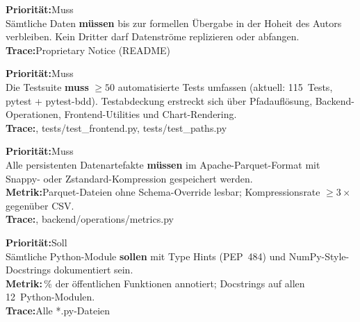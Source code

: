 \documentclass[11pt, a4paper, oneside, openany]{report}
\newcommand{\code}[1]{{\codefont\small\textcolor{DeepNavy}{#1}}}
\begin{document}
\vspace{6pt}

\begin{reqbox}
\textbf{Priorität:}\;Muss \\[4pt]
Sämtliche Daten \textbf{müssen} bis zur formellen Übergabe in der Hoheit des Autors verbleiben. Kein Dritter darf Datenströme replizieren oder abfangen. \\[4pt]
\textbf{Trace:}\;Proprietary Notice (README)
\end{reqbox}

\vspace{6pt}

\begin{reqbox}
\textbf{Priorität:}\;Muss \\[4pt]
Die Testsuite \textbf{muss} $\geq 50$ automatisierte Tests umfassen (aktuell: 115~Tests, pytest + pytest-bdd). Testabdeckung erstreckt sich über Pfadauflösung, Backend-Operationen, Frontend-Utilities und Chart-Rendering. \\[4pt]
\textbf{Trace:}\;\code{tests/test\_backend.py}, \code{tests/test\_frontend.py}, \code{tests/test\_paths.py}
\end{reqbox}

\vspace{6pt}

\begin{reqbox}
\textbf{Priorität:}\;Muss \\[4pt]
Alle persistenten Datenartefakte \textbf{müssen} im Apache-Parquet-Format mit Snappy- oder Zstandard-Kompression gespeichert werden. \\[4pt]
\textbf{Metrik:}\;Parquet-Dateien ohne Schema-Override lesbar; Kompressionsrate $\geq 3\times$ gegenüber CSV. \\[4pt]
\textbf{Trace:}\;\code{backend/operations/build\_master\_parquet.py}, \code{backend/operations/metrics.py}
\end{reqbox}

\vspace{6pt}

\begin{reqbox}
\textbf{Priorität:}\;Soll \\[4pt]
Sämtliche Python-Module \textbf{sollen} mit Type Hints (PEP~484) und NumPy-Style-Docstrings dokumentiert sein. \\[4pt]
\textbf{Metrik:}\,\% der öffentlichen Funktionen annotiert; Docstrings auf allen 12~Python-Modulen. \\[4pt]
\textbf{Trace:}\;Alle \code{*.py}-Dateien
\end{reqbox}
\end{document}
